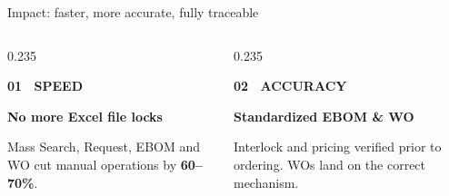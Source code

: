 \begin{frame}{Impact: faster, more accurate, fully traceable}
    \vspace{0.2cm}
    
    \begin{columns}[T]
        \begin{column}{0.235\textwidth}
            \begin{minimalcard}[height=4.8cm]
                {\fontsize{7}{8.5}\bfseries\selectfont\color{primary}01 \textbullet\ SPEED}\par
                \vspace{6pt}
                {\fontsize{8.5}{11}\bfseries\selectfont\color{darkslate}No more Excel file locks}\par
                \vspace{8pt}
                {\fontsize{7.5}{10}\selectfont\color{mutedgray}
                Mass Search, Request, EBOM and WO cut manual operations by \textbf{\color{primary}60--70\%}.
                }
            \end{minimalcard}
        \end{column}
        
        \begin{column}{0.235\textwidth}
            \begin{minimalcard}[height=4.8cm]
                {\fontsize{7}{8.5}\bfseries\selectfont\color{primary}02 \textbullet\ ACCURACY}\par
                \vspace{6pt}
                {\fontsize{8.5}{11}\bfseries\selectfont\color{darkslate}Standardized EBOM \& WO}\par
                \vspace{8pt}
                {\fontsize{7.5}{10}\selectfont\color{mutedgray}
                Interlock and pricing verified prior to ordering. WOs land on the correct mechanism.
                }
            \end{minimalcard}
        \end{column}
        

\end{columns}
\end{frame}
